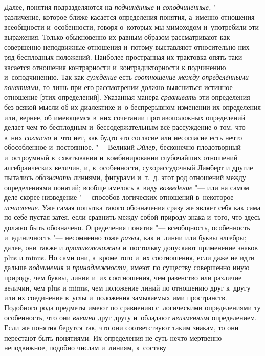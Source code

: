 Далее, понятия подразделяются на {\em подчинённые} и {\em соподчинённые,} "---
различение, которое ближе касается определения понятия, а~именно отношения
всеобщности и~особенности, говоря о~которых мы мимоходом и~употребили эти
выражения.
Только обыкновенно их равным образом
рассматривают как совершенно неподвижные отношения и~потому выставляют
относительно них ряд бесплодных положений. Наиболее пространная их
трактовка опять-таки касается отношения контрарности и~контрадикторности к
подчинению и~соподчинению. Так как {\em суждение} есть {\em соотношение между
определёнными понятиями,} то лишь при его рассмотрении должно выясниться
истинное отношение [этих определений]. Указанная манера {\em сравнивать} эти
определения без всякой мысли об их диалектике и~о беспрерывном изменении их
определения или, вернее, об имеющемся в~них сочетании противоположных
определений делает чем-то бесплодным и~бессодержательным всё рассуждение о
том, что в~них {\em согласно} и~что нет, как будто это согласие или несогласие
есть нечто обособленное и~постоянное. "--- Великий {\em Эйлер,} бесконечно
плодотворный и~остроумный в~схватывании и~комбинировании глубочайших
отношений алгебраических величин, и, в~особенности, сухорассудочный Ламберт
и другие пытались {\em обозначать} линиями, фигурами и~т.~д. этот род отношений
между определениями понятий; вообще имелось в~виду {\em возведение} "--- или на
самом деле скорее низведение "--- способов логических отношений в~некоторое
{\em исчисление}. Уже самая попытка такого обозначения сразу же являет себя
как сама по себе пустая затея, если сравнить между собой природу знака и~того,
что здесь должно быть обозначено. Определения понятия "--- всеобщность,
особенность и~единичность "--- несомненно тоже {\em разны,} как и~линии или
буквы алгебры; далее, они также и {\em противоположны} и~постольку допускают
применение знаков plus и minus. Но сами они, а~кроме того и~их соотношения,
если даже не идти дальше {\em подчинения} и {\em принадлежности,} имеют по
существу совершенно иную природу, чем буквы, линии и~их соотношения, чем
равенство или различие величин, чем plus и minus, чем положение линий по
отношению друг к~другу или их соединение в~углы и~положения замыкаемых ими
пространств. Подобного рода предметы имеют по сравнению с~логическими
определениями ту особенность, что они {\em внешни} друг другу и~обладают {\em
неизменным} определением. Если же понятия берутся так, что они
соответствуют таким знакам, то они перестают быть понятиями. Их определения
не суть нечто мертвенно-неподвижное, подобно числам и~линиям, к~составу
